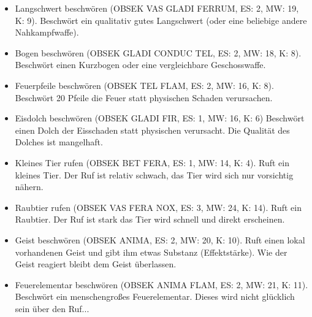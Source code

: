 \documentclass{article}
\begin{document}
\begin{itemize}
\item Langschwert beschwören (OBSEK VAS GLADI FERRUM, ES: 2, MW: 19, K: 9). Beschwört ein qualitativ gutes Langschwert (oder eine beliebige andere Nahkampfwaffe).
\end{itemize}

\begin{itemize}
\item Bogen beschwören (OBSEK GLADI CONDUC TEL, ES: 2, MW: 18, K: 8). Beschwört einen Kurzbogen oder eine vergleichbare Geschosswaffe.
\end{itemize}

\begin{itemize}
\item Feuerpfeile beschwören (OBSEK TEL FLAM, ES: 2, MW: 16, K: 8). Beschwört 20 Pfeile die Feuer statt physischen Schaden verursachen.
\end{itemize}

\begin{itemize}
\item Eisdolch beschwören (OBSEK GLADI FIR, ES: 1, MW: 16, K: 6) Beschwört einen Dolch der Eisschaden statt physischen verursacht. Die Qualität des Dolches ist mangelhaft.
\end{itemize}

\begin{itemize}
\item Kleines Tier rufen (OBSEK BET FERA, ES: 1, MW: 14, K: 4). Ruft ein kleines Tier. Der Ruf ist relativ schwach, das Tier wird sich nur vorsichtig nähern.
\end{itemize}

\begin{itemize}
\item Raubtier rufen (OBSEK VAS FERA NOX, ES: 3, MW: 24, K: 14). Ruft ein Raubtier. Der Ruf ist stark das Tier wird schnell und direkt erscheinen.
\end{itemize}

\begin{itemize}
\item Geist beschwören (OBSEK ANIMA, ES: 2, MW: 20, K: 10). Ruft einen lokal vorhandenen Geist und gibt ihm etwas Substanz (Effektstärke). Wie der Geist reagiert bleibt dem Geist überlassen.
\end{itemize}

\begin{itemize}
\item Feuerelementar beschwören (OBSEK ANIMA FLAM, ES: 2, MW: 21, K: 11). Beschwört ein menschengroßes Feuerelementar. Dieses wird nicht glücklich sein über den Ruf...
\end{itemize}
\end{document}

